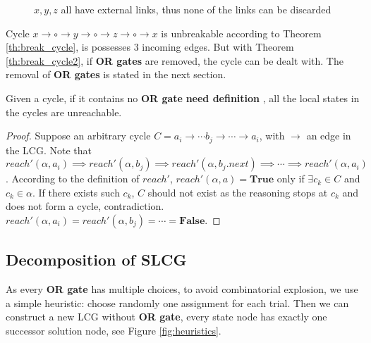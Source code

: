 \begin{example}\label{example:cycles}
    \begin{figure}[ht]
        \centering
        
        \caption[Removal of cycles]{$x,y,z$ all have external links, thus none of the links can be discarded}
        \label{cycle3}
    \end{figure}
    
    Cycle $x\to \circ \to y \to \circ \to z\to \circ \to x$ is unbreakable according to Theorem \ref{th:break_cycle}, is possesses 3 incoming edges.
    But with Theorem \ref{th:break_cycle2}, if \textbf{OR gates} are removed, the cycle can be dealt with.
    The removal of \textbf{OR gates} is stated in the next section.
\end{example}

\begin{theorem}\label{th:break_cycle2}
 Given a cycle, if it contains no \textbf{OR gate}%
 \textbf{need definition}
, all the local states in the cycles are unreachable.
\end{theorem}

\begin{proof}
Suppose an arbitrary cycle $C=a_i\to \cdots b_j\to\cdots \to a_i$, with $\to$ an edge in the LCG.
Note that $reach'(\alpha,a_i)\implies reach'(\alpha,b_j)\implies reach'(\alpha,b_j.next)\implies \cdots\implies reach'(\alpha,a_i)$.
According to the definition of $reach'$, $reach'(\alpha,a)=\mathbf{True}$ only if $\exists c_k\in C$ and $c_k\in \alpha$.
If there exists such $c_k$, $C$ should not exist as the reasoning stops at $c_k$ and does not form a cycle, contradiction.
$reach'(\alpha,a_i)=reach'(\alpha,b_j)=\cdots =\mathbf{False}$.
\end{proof}

\subsection{Decomposition of SLCG}
As every \textbf{OR gate} has multiple choices, to avoid combinatorial explosion, we use a simple heuristic: 
choose randomly one assignment for each trial.
Then we can construct a new LCG without \textbf{OR gate}, every state node has exactly one successor solution node, see Figure \ref{fig:heuristics}.

